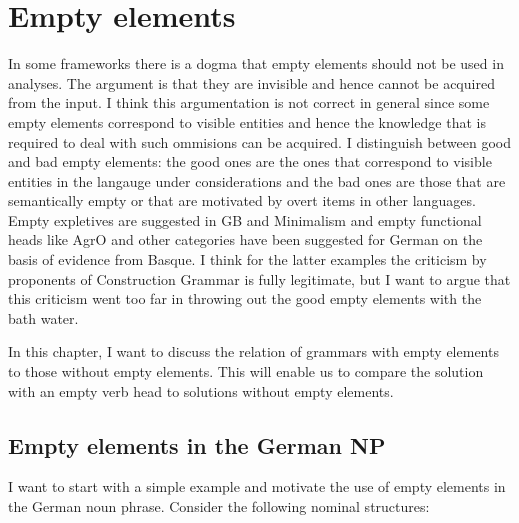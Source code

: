 

\chapter{Empty elements}
\label{chap-empty}





In some frameworks there is a dogma that empty elements should not be used in analyses. The argument
is that they are invisible and hence cannot be acquired from the input. I think this argumentation
is not correct in general since some empty elements correspond to visible entities and hence the
knowledge that is required to deal with such ommisions can be acquired. I distinguish between good
and bad empty elements: the good ones are the ones that correspond to visible entities in the
langauge under considerations and the bad ones are those that are semantically empty or that are
motivated by overt items in other languages. Empty expletives are suggested in GB and Minimalism and
empty functional heads like AgrO and other categories have been suggested for German on the basis of
evidence from Basque. I think for the latter examples the criticism by proponents of Construction
Grammar is fully legitimate, but I want to argue that this criticism went too far in throwing out the
good empty elements with the bath water.


In this chapter, I want to discuss the relation of grammars with empty elements to those
without empty elements. This will enable us to compare the solution with an empty verb head 
to solutions without empty elements.


\section{Empty elements in the German NP}

I want to start with a simple example and motivate the use of empty elements in the German noun
phrase. Consider the following nominal structures:

